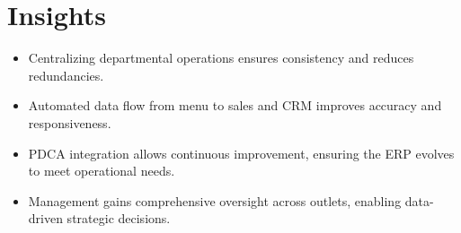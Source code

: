\section*{Insights}

\begin{itemize}
    \item Centralizing departmental operations ensures consistency and reduces redundancies.
    \item Automated data flow from menu to sales and CRM improves accuracy and responsiveness.
    \item PDCA integration allows continuous improvement, ensuring the ERP evolves to meet operational needs.
    \item Management gains comprehensive oversight across outlets, enabling data-driven strategic decisions.
\end{itemize}
